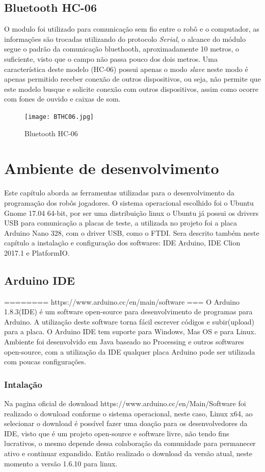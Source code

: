 \documentclass[a4paper,12pt,portuguese]{ufms-cpcx}
\begin{document}
\section{Bluetooth HC-06}\label{bthc06}
O modulo foi utilizado para comunicação sem fio entre o robô e o computador, as informações são trocadas utilizando do protocolo \textit{Serial}, o alcance do módulo segue o padrão da comunicação bluethooth, aproximadamente 10 metros, o suficiente, visto que o campo não passa pouco dos dois metros. Uma característica deste modelo (HC-06) possui apenas o modo \textit{slave} neste modo é apenas permitido receber conexão de outros dispositivos, ou seja, não permite que este modelo busque e solicite conexão com outros dispositivos, assim como ocorre com fones de ouvido e caixas de som.
\begin{figure}[H]	
	\centering
	\texttt{[image: BTHC06.jpg]}
	\caption{Bluetooth HC-06}
\end{figure}



\chapter{Ambiente de desenvolvimento}
Este capítulo aborda as ferramentas utilizadas para o desenvolvimento da programação dos robôs jogadores. O sistema operacional escolhido foi o Ubuntu Gnome 17.04 64-bit, por ser uma distribuição linux o Ubuntu já possui os drivers USB para comunicação a placas de teste, a utilizada no projeto foi a placa Arduino Nano 328, com o driver USB, como o FTDI. Sera descrito também neste capítulo a instalação e configuração dos softwares: IDE Arduino, IDE Clion 2017.1 e PlatformIO.

\section{Arduino IDE}\label{arduinoide}
======== https://www.arduino.cc/en/main/software ===
O Arduino 1.8.3(IDE) é um software open-source para desenvolvimento de programas para Arduino. A utilização deste software torna fácil escrever códigos e subir(upload) para a placa. O Arduino IDE tem suporte para Windows, Mas OS e para Linux. Ambiente foi desenvolvido em Java baseado no Processing e outros softwares open-source, com a utilização da IDE qualquer placa Arduino pode ser utilizada com poucas configurações.

\subsection{Intalação}
Na pagina oficial de download https://www.arduino.cc/en/Main/Software foi realizado o download conforme o sistema operacional, neste caso, Linux x64, ao selecionar o download é possível fazer uma doação para os desenvolvedores da IDE, visto que é um projeto open-source e software livre, não tendo fins lucrativos, o mesmo depende dessa colaboração da comunidade para permanecer ativo e continuar expandido. Então realizado o download da versão atual, neste momento a versão 1.6.10 para linux.
\end{document}
